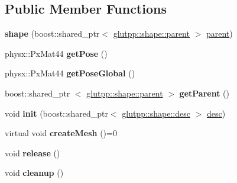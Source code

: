 \subsection*{\-Public \-Member \-Functions}
\begin{DoxyCompactItemize}
\item 
\hypertarget{classglutpp_1_1shape_1_1shape_ad27024bb015566044175510b3b13b312}{{\bfseries shape} (boost\-::shared\-\_\-ptr$<$ \hyperlink{classglutpp_1_1shape_1_1parent}{glutpp\-::shape\-::parent} $>$ \hyperlink{classglutpp_1_1shape_1_1parent}{parent})}\label{classglutpp_1_1shape_1_1shape_ad27024bb015566044175510b3b13b312}

\item 
\hypertarget{classglutpp_1_1shape_1_1shape_af6b5b0c8d6c543e0e7684579dc4a44bb}{physx\-::\-Px\-Mat44 {\bfseries get\-Pose} ()}\label{classglutpp_1_1shape_1_1shape_af6b5b0c8d6c543e0e7684579dc4a44bb}

\item 
\hypertarget{classglutpp_1_1shape_1_1shape_a0f8827ec90ebe784f6bd5318cb2393d7}{physx\-::\-Px\-Mat44 {\bfseries get\-Pose\-Global} ()}\label{classglutpp_1_1shape_1_1shape_a0f8827ec90ebe784f6bd5318cb2393d7}

\item 
\hypertarget{classglutpp_1_1shape_1_1shape_a423c20c1de295bed60771370113e4b98}{boost\-::shared\-\_\-ptr\*
$<$ \hyperlink{classglutpp_1_1shape_1_1parent}{glutpp\-::shape\-::parent} $>$ {\bfseries get\-Parent} ()}\label{classglutpp_1_1shape_1_1shape_a423c20c1de295bed60771370113e4b98}

\item 
\hypertarget{classglutpp_1_1shape_1_1shape_aeab11615caba7d21e8754cfdf0c37e31}{void {\bfseries init} (boost\-::shared\-\_\-ptr$<$ \hyperlink{classglutpp_1_1shape_1_1desc}{glutpp\-::shape\-::desc} $>$ \hyperlink{classglutpp_1_1shape_1_1desc}{desc})}\label{classglutpp_1_1shape_1_1shape_aeab11615caba7d21e8754cfdf0c37e31}

\item 
\hypertarget{classglutpp_1_1shape_1_1shape_acc94e366420871ee4e55c089d9dc3268}{virtual void {\bfseries create\-Mesh} ()=0}\label{classglutpp_1_1shape_1_1shape_acc94e366420871ee4e55c089d9dc3268}

\item 
\hypertarget{classglutpp_1_1shape_1_1shape_a7788abfe661a5fd92c93e2081e1d72e7}{void {\bfseries release} ()}\label{classglutpp_1_1shape_1_1shape_a7788abfe661a5fd92c93e2081e1d72e7}

\item 
\hypertarget{classglutpp_1_1shape_1_1shape_ac4c6568d96e8b0701e6c161f99e27be3}{void {\bfseries cleanup} ()}\label{classglutpp_1_1shape_1_1shape_ac4c6568d96e8b0701e6c161f99e27be3}


\end{DoxyCompactItemize}
